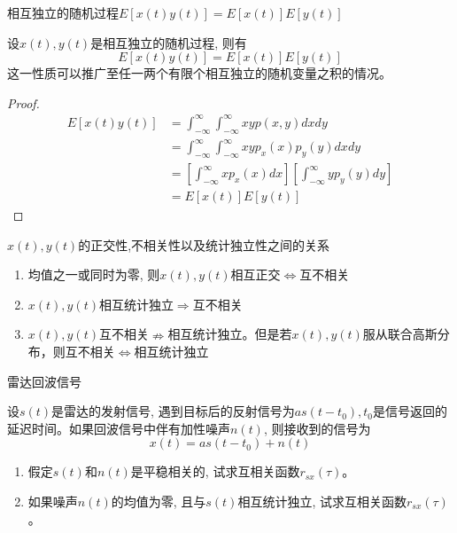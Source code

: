 \begin{frame}{相互独立的随机过程$E[x(t)y(t)]=E[x(t)]E[y(t)]$}
\begin{block}{}
	设$x(t), y(t)$是相互独立的随机过程, 则有
	\[ E[x(t)y(t)]=E[x(t)]E[y(t)]\]
	这一性质可以推广至任一两个有限个相互独立的随机变量之积的情况。
\end{block}
\begin{proof}
	\begin{align*}
	E[x(t)y(t)]&=\int_{-\infty}^{\infty}\int_{-\infty}^{\infty}xyp(x,y)dxdy\\
	&=\int_{-\infty}^{\infty}\int_{-\infty}^{\infty}xyp_x(x)p_y(y)dxdy\\
	&=\left[\int_{-\infty}^{\infty}xp_x(x)dx\right]\left[\int_{-\infty}^{\infty}yp_y(y)dy\right]\\
	&=E[x(t)]E[y(t)]
	\end{align*}
\end{proof}
\end{frame}

\begin{frame}{$x(t),y(t)$的正交性,不相关性以及统计独立性之间的关系}
\begin{enumerate}
	\item 均值之一或同时为零, 则$x(t), y(t)$相互正交$\Leftrightarrow$互不相关\\
	\item $x(t), y(t)$相互统计独立$\Rightarrow$互不相关
	\item $x(t), y(t)$互不相关$\nRightarrow$相互统计独立。但是若$x(t), y(t)$服从联合高斯分布，则互不相关$\Leftrightarrow$相互统计独立
\end{enumerate}
\end{frame}

\begin{frame}{雷达回波信号}
\begin{example}
	设$s(t)$是雷达的发射信号, 遇到目标后的反射信号为$as(t-t_0), t_0$是信号返回的延迟时间。如果回波信号中伴有加性噪声$n(t)$, 则接收到的信号为
	\[x(t)=as(t-t_0)+n(t) \]
	\begin{enumerate}
		\item 假定$s(t)$和$n(t)$是平稳相关的, 试求互相关函数$r_{sx}(\tau)$。
		\item 如果噪声$n(t)$的均值为零, 且与$s(t)$相互统计独立, 试求互相关函数$r_{sx}(\tau)$。
	\end{enumerate}
\end{example}
\end{frame}

